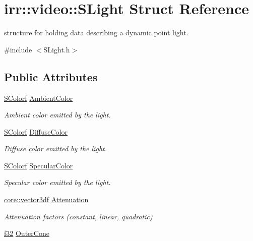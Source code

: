 \hypertarget{structirr_1_1video_1_1SLight}{}\section{irr\+:\+:video\+:\+:S\+Light Struct Reference}
\label{structirr_1_1video_1_1SLight}


structure for holding data describing a dynamic point light.  




{\ttfamily \#include $<$S\+Light.\+h$>$}

\subsection*{Public Attributes}
\begin{DoxyCompactItemize}
\item 
\hyperlink{classirr_1_1video_1_1SColorf}{S\+Colorf} \hyperlink{structirr_1_1video_1_1SLight_a120e9234a2141eb1fbe46cad23794e0e}{Ambient\+Color}\hypertarget{structirr_1_1video_1_1SLight_a120e9234a2141eb1fbe46cad23794e0e}{}\label{structirr_1_1video_1_1SLight_a120e9234a2141eb1fbe46cad23794e0e}

\begin{DoxyCompactList}\small\item\em Ambient color emitted by the light. \end{DoxyCompactList}\item 
\hyperlink{classirr_1_1video_1_1SColorf}{S\+Colorf} \hyperlink{structirr_1_1video_1_1SLight_a226622e93aa1e249fe876fdb9d0186fe}{Diffuse\+Color}
\begin{DoxyCompactList}\small\item\em Diffuse color emitted by the light. \end{DoxyCompactList}\item 
\hyperlink{classirr_1_1video_1_1SColorf}{S\+Colorf} \hyperlink{structirr_1_1video_1_1SLight_a2d66ad28850a8588b2ba727103710604}{Specular\+Color}
\begin{DoxyCompactList}\small\item\em Specular color emitted by the light. \end{DoxyCompactList}\item 
\hyperlink{namespaceirr_1_1core_a06f169d08b5c429f5575acb7edbad811}{core\+::vector3df} \hyperlink{structirr_1_1video_1_1SLight_a06c10ab01b8ad1ee554b956bd5baeacc}{Attenuation}
\begin{DoxyCompactList}\small\item\em Attenuation factors (constant, linear, quadratic) \end{DoxyCompactList}\item 
\hyperlink{namespaceirr_a0277be98d67dc26ff93b1a6a1d086b07}{f32} \hyperlink{structirr_1_1video_1_1SLight_a38ee805b9145d4ab1b1a889bbded9adc}{Outer\+Cone}\hypertarget{structirr_1_1video_1_1SLight_a38ee805b9145d4ab1b1a889bbded9adc}{}\label{structirr_1_1video_1_1SLight_a38ee805b9145d4ab1b1a889bbded9adc}


\end{DoxyCompactItemize}

